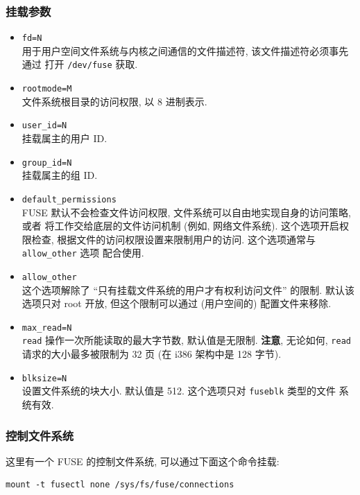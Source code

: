 \documentclass[nofonts, titlepage]{ctexart}
\begin{document}
\subsubsection{挂载参数}\label{ux6302ux8f7dux53c2ux6570}

\begin{itemize}
\item
  \texttt{fd=N}\\用于用户空间文件系统与内核之间通信的文件描述符,
  该文件描述符必须事先通过 打开 \texttt{/dev/fuse} 获取.
\item
  \texttt{rootmode=M}\\文件系统根目录的访问权限, 以 8 进制表示.
\item
  \texttt{user\_id=N}\\挂载属主的用户 ID.
\item
  \texttt{group\_id=N}\\挂载属主的组 ID.
\item
  \texttt{default\_permissions}\\FUSE 默认不会检查文件访问权限,
  文件系统可以自由地实现自身的访问策略, 或者
  将工作交给底层的文件访问机制 (例如, 网络文件系统).
  这个选项开启权限检查, 根据文件的访问权限设置来限制用户的访问.
  这个选项通常与 \texttt{allow\_other} 选项 配合使用.
\item
  \texttt{allow\_other}\\这个选项解除了
  ``只有挂载文件系统的用户才有权利访问文件'' 的限制. 默认该 选项只对
  root 开放, 但这个限制可以通过 (用户空间的) 配置文件来移除.
\item
  \texttt{max\_read=N}\\\texttt{read} 操作一次所能读取的最大字节数,
  默认值是无限制. \textbf{注意}, 无论如何, \texttt{read}
  请求的大小最多被限制为 32 页 (在 i386 架构中是 128 字节).
\item
  \texttt{blksize=N}\\设置文件系统的块大小. 默认值是 512. 这个选项只对
  \texttt{fuseblk} 类型的文件 系统有效.
\end{itemize}

\subsubsection{控制文件系统}\label{ux63a7ux5236ux6587ux4ef6ux7cfbux7edf}

这里有一个 FUSE 的控制文件系统, 可以通过下面这个命令挂载:

\begin{verbatim}
mount -t fusectl none /sys/fs/fuse/connections
\end{verbatim}
\end{document}
